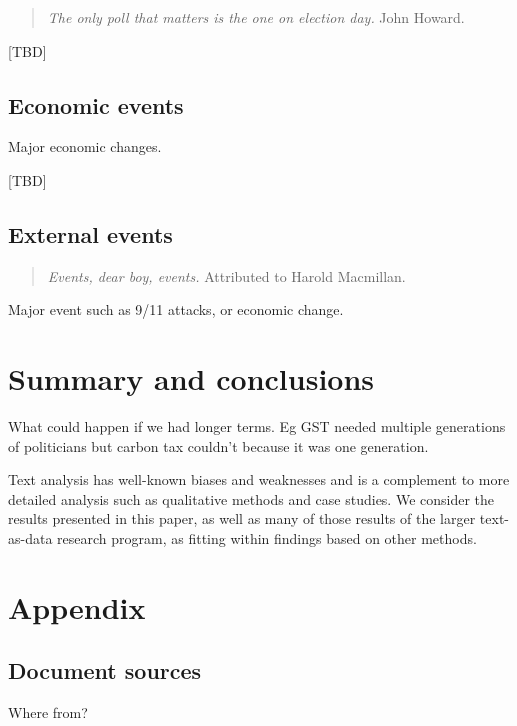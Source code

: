 \documentclass[12pt,]{article}
\theoremstyle{definition}
\theoremstyle{definition}
\theoremstyle{definition}
\theoremstyle{remark}
\begin{document}
\begin{quote}
\emph{The only poll that matters is the one on election day.} John
Howard.
\end{quote}

{[}TBD{]}

\subsection{Economic events}\label{economic-events}

Major economic changes.

{[}TBD{]}

\subsection{External events}\label{external-events}

\begin{quote}
\emph{Events, dear boy, events.} Attributed to Harold Macmillan.
\end{quote}

Major event such as 9/11 attacks, or economic change.

\section{Summary and conclusions}\label{summary-and-conclusions}

What could happen if we had longer terms. Eg GST needed multiple
generations of politicians but carbon tax couldn't because it was one
generation.

Text analysis has well-known biases and weaknesses and is a complement
to more detailed analysis such as qualitative methods and case studies.
We consider the results presented in this paper, as well as many of
those results of the larger text-as-data research program, as fitting
within findings based on other methods.

\newpage

\section{Appendix}\label{appendix}

\subsection{Document sources}\label{document-sources}

Where from?
\end{document}
